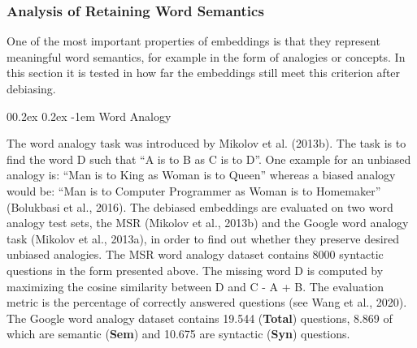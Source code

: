 \documentclass[
  english,
  man,floatsintext]{apa6}
\makeatletter
\let\oldparagraph\paragraph
\renewcommand{\paragraph}[1]{\oldparagraph{#1}\mbox{}}
\renewcommand{\paragraph}{\@startsection{paragraph}{4}{\parindent}%
  {0\baselineskip \@plus 0.2ex \@minus 0.2ex}%
  {-1em}%
  {\normalfont\normalsize\bfseries\itshape\typesectitle}}
\makeatother
\begin{document}
\hypertarget{analysis-of-retaining-word-semantics}{%
\subsubsection{Analysis of Retaining Word Semantics}\label{analysis-of-retaining-word-semantics}}

One of the most important properties of embeddings is that they represent meaningful word semantics, for example in the form of analogies or concepts. In this section it is tested in how far the embeddings still meet this criterion after debiasing.

\hypertarget{word-analogy}{%
\paragraph{Word Analogy}\label{word-analogy}}

The word analogy task was introduced by Mikolov et al. (2013b). The task is to find the word D such that \enquote{A is to B as C is to D}. One example for an unbiased analogy is: \enquote{Man is to King as Woman is to Queen} whereas a biased analogy would be: \enquote{Man is to Computer Programmer as Woman is to Homemaker} (Bolukbasi et al., 2016). The debiased embeddings are evaluated on two word analogy test sets, the MSR (Mikolov et al., 2013b) and the Google word analogy task (Mikolov et al., 2013a), in order to find out whether they preserve desired unbiased analogies.
The MSR word analogy dataset contains 8000 syntactic questions in the form presented above. The missing word D is computed by maximizing the cosine similarity between D and C - A + B. The evaluation metric is the percentage of correctly answered questions (see Wang et al., 2020).
The Google word analogy dataset contains 19.544 (\textbf{Total}) questions, 8.869 of which are semantic (\textbf{Sem}) and 10.675 are syntactic (\textbf{Syn}) questions.
\end{document}
